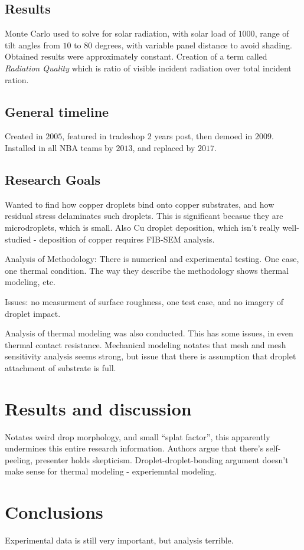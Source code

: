 \documentclass[10pt, oneside]{article}
\begin{document}
\subsection{Results}
Monte Carlo used to solve for solar radiation, with solar load of $1000$, range of tilt angles from $10$ to $80$ degrees, with variable panel distance to avoid shading. Obtained results were approximately constant. 
Creation of a term called \textit{Radiation Quality} which is ratio of visible incident radiation over total incident ration. 
\subsection{General timeline}
Created in $2005$, featured in tradeshop 2 years post, then demoed in $2009$. Installed in all NBA teams by $2013$, and replaced by $2017$.

\subsection{Research Goals}
Wanted to find how copper droplets bind onto copper substrates, and how residual stress delaminates such droplets. This is significant becasue they are microdroplets, which is small. Also Cu droplet deposition, which isn't really well-studied - deposition of copper requires FIB-SEM analysis. 

Analysis of Methodology:
There is numerical and experimental testing. One case, one thermal condition. The way they describe the methodology shows thermal modeling, etc. 

Issues: no measurment of surface roughness, one test case, and no imagery of droplet impact. 

Analysis of thermal modeling was also conducted. This has some issues, in even thermal contact resistance. Mechanical modeling notates that mesh and mesh sensitivity analysis seems strong, but issue that there is assumption that droplet attachment of substrate is full. 

\section{Results and discussion}
Notates weird drop morphology, and small ``splat factor'', this apparently undermines this entire research information. Authors argue that there's self-peeling, presenter holds skepticism. Droplet-droplet-bonding argument doesn't make sense for thermal modeling - experiemntal modeling. 

\section{Conclusions}
Experimental data is still very important, but analysis terrible. 
\end{document}
